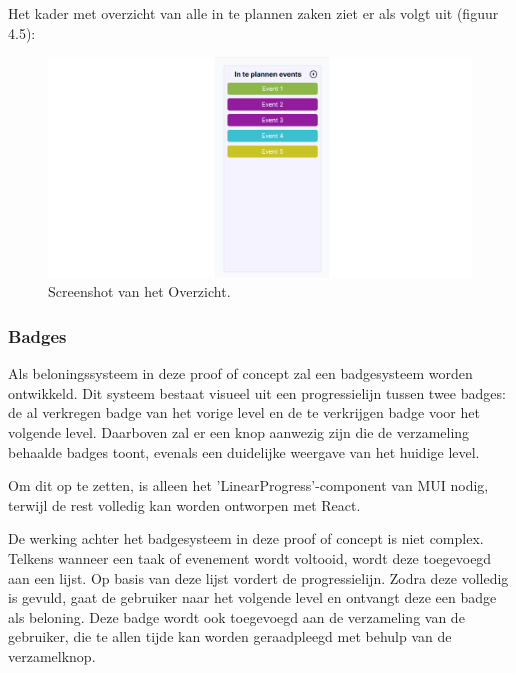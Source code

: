 Het kader met overzicht van alle in te plannen zaken ziet er als volgt uit (figuur 4.5):

\begin{figure}[h]
    \centering
    \includegraphics[width=\textwidth]{graphics/screenshot_overzicht.png}
    \caption{Screenshot van het Overzicht.}
    \label{fig:screenshot_overzicht}
\end{figure}


\subsubsection{Badges}

Als beloningssysteem in deze proof of concept zal een badgesysteem worden ontwikkeld. Dit systeem bestaat visueel uit een progressielijn tussen twee badges: de al verkregen badge van het vorige level en de te verkrijgen badge voor het volgende level. Daarboven zal er een knop aanwezig zijn die de verzameling behaalde badges toont, evenals een duidelijke weergave van het huidige level. \newline

Om dit op te zetten, is alleen het 'LinearProgress'-component van MUI nodig, terwijl de rest volledig kan worden ontworpen met React. \newline

De werking achter het badgesysteem in deze proof of concept is niet complex. Telkens wanneer een taak of evenement wordt voltooid, wordt deze toegevoegd aan een lijst. Op basis van deze lijst vordert de progressielijn. Zodra deze volledig is gevuld, gaat de gebruiker naar het volgende level en ontvangt deze een badge als beloning. Deze badge wordt ook toegevoegd aan de verzameling van de gebruiker, die te allen tijde kan worden geraadpleegd met behulp van de verzamelknop. \newline


